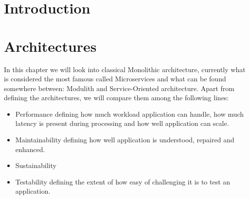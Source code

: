 \chapter*{Introduction}


\setcounter{page}{1}

\begin{chapterabstract}
    \lipsum[1]
\end{chapterabstract}

\lipsum[1]

\chapter{Architectures}
In this chapter we will look into classical Monolithic architecture, currently what is considered the most famous called Microservices and what can be found somewhere between: Modulith and Service-Oriented architecture. Apart from defining the architectures, we will compare them among the following lines:
\begin{itemize}
    \item Performance defining how much workload application can handle, how much latency is present during processing and how well application can scale.
    \item Maintainability defining how well application is understood, repaired and enhanced.
    \item Sustainability
    \item Testability defining the extent of how easy of challenging it is to test an application.
\end{itemize}

